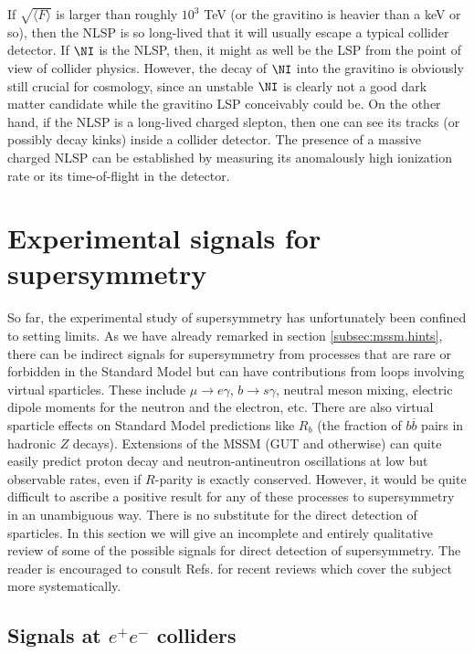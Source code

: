 If $\sqrt{\langle F \rangle}$ is
larger than roughly $10^3$ TeV
(or the gravitino is heavier than a keV or so), 
then the NLSP is so long-lived that
it will usually escape a typical collider detector.
If $\NI$ is the NLSP, then, it might as well be
the LSP from the point of
view of collider physics.
However, the decay of $\NI$ into the gravitino is obviously still crucial
for cosmology, since an unstable $\NI$ is clearly not a good dark matter
candidate while the gravitino LSP conceivably could be.
On the other hand, if the NLSP is a long-lived charged slepton,
then one can see its tracks (or possibly decay kinks) inside a collider
detector.\cite{DDRT} The presence of a massive charged NLSP can be
established by measuring its anomalously high ionization rate or its
time-of-flight in the detector.

\section{Experimental signals for supersymmetry}\label{sec:signals}
\setcounter{equation}{0}
\setcounter{footnote}{1}

So far, the experimental study of supersymmetry has unfortunately
been confined to setting limits. As we have already remarked in section
\ref{subsec:mssm.hints}, there can be indirect signals
for supersymmetry from processes that are
rare or forbidden in the Standard Model
but can have contributions from loops
involving virtual sparticles.
These include $\mu\rightarrow e\gamma$, $b\rightarrow s\gamma$,
neutral meson mixing,
electric dipole moments for the neutron and the electron, etc.
There are also virtual sparticle effects on Standard Model predictions
like $R_b$ (the fraction of $b\overline b$ pairs in hadronic $Z$
decays).\cite{Rb}
Extensions of the MSSM (GUT and otherwise) can quite easily predict
proton decay and neutron-antineutron oscillations at low but observable
rates, even if $R$-parity is exactly conserved. However, it would be quite
difficult to ascribe a positive result for any of these processes to
supersymmetry in an unambiguous way. There is no substitute for the
direct detection of sparticles. In this section we will give
an incomplete and entirely qualitative review of some of the possible
signals for direct detection of supersymmetry. The reader
is encouraged to consult
Refs.\cite{DPFpheno,Tatareview,snowmass96} 
for recent reviews which cover the subject more systematically.

\subsection{Signals at $e^+e^-$ colliders}\label{subsec:signals.LEPNLC}

